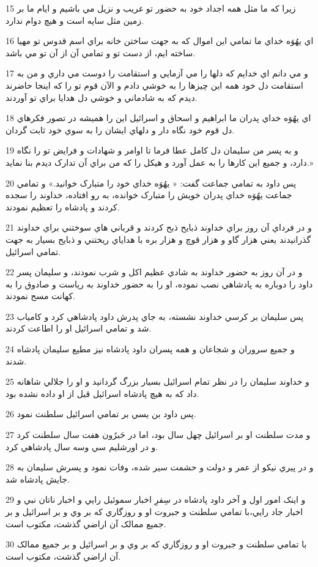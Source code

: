 \par 15 زيرا که ما مثل همه اجداد خود به حضور تو غريب و نزيل مي باشيم و ايام ما بر زمين مثل سايه است و هيچ دوام ندارد.
\par 16 اي يهُوَه خداي ما تمامي اين اموال که به جهت ساختن خانه براي اسم قدوس تو مهيا ساخته ايم، از دست تو و تمامي آن از آن تو مي باشد.
\par 17 و مي دانم اي خدايم که دلها را مي آزمايي و استقامت را دوست مي داري و من به استقامت دل خود همه اين چيزها را به خوشي دادم و الآن قوم تو را که اينجا حاضرند ديدم که به شادماني و خوشي دل هدايا براي تو آوردند.
\par 18 اي يهُوَه خداي پدران ما ابراهيم و اسحاق و اسرائيل اين را هميشه در تصور فکرهاي دل قوم خود نگاه دار و دلهاي ايشان را به سوي خود ثابت گردان.
\par 19 و به پسر من سليمان دل کامل عطا فرما تا اوامر و شهادات و فرايض تو را نگاه دارد، و جميع اين کارها را به عمل آورد و هيکل را که من براي آن تدارک ديدم بنا نمايد.»
\par 20 پس داود به تمامي جماعت گفت: « يهُوَه خداي خود را متبارک خوانيد.» و تمامي جماعت يهُوَه خداي پدران خويش را متبارک خوانده، به رو افتاده، خداوند را سجده کردند و پادشاه را تعظيم نمودند.
\par 21 و در فرداي آن روز براي خداوند ذبايح ذبح کردند و قرباني هاي سوختني براي خداوند گذرانيدند يعني هزار گاو و هزار قوچ و هزار بره با هداياي ريختني و ذبايح بسيار به جهت تمامي اسرائيل.
\par 22 و در آن روز به حضور خداوند به شادي عظيم اکل و شرب نمودند، و سليمان پسر داود را دوباره به پادشاهي نصب نموده، او را به حضور خداوند به رياست و صادوق را به کهانت مسح نمودند.
\par 23 پس سليمان بر کرسي خداوند نشسته، به جاي پدرش داود پادشاهي کرد و کامياب شد و تمامي اسرائيل او را اطاعت کردند.
\par 24 و جميع سروران و شجاعان و همه پسران داود پادشاه نيز مطيع سليمان پادشاه شدند.
\par 25 و خداوند سليمان را در نظر تمام اسرائيل بسيار بزرگ گردانيد و او را جلالي شاهانه داد که به هيچ پادشاه اسرائيل قبل از او داده نشده بود.
\par 26 پس داود بن يسي بر تمامي اسرائيل سلطنت نمود.
\par 27 و مدت سلطنت او بر اسرائيل چهل سال بود، اما در حَبرُون هفت سال سلطنت کرد و در اورشليم سي وسه سال پادشاهي کرد.
\par 28 و در پيري نيکو از عمر و دولت و حشمت سير شده، وفات نمود و پسرش سليمان به جايش پادشاه شد.
\par 29 و اينک امور اول و آخر داود پادشاه در سِفرِ اخبار سموئيل رايي و اخبار ناتان نبي و اخبار جاد رايي،با تمامي سلطنت و جبروت او و روزگاري که بر وي و بر اسرائيل و بر جميع ممالک آن اراضي گذشت، مکتوب است.
\par 30 با تمامي سلطنت و جبروت او و روزگاري که بر وي و بر اسرائيل و بر جميع ممالک آن اراضي گذشت، مکتوب است.


